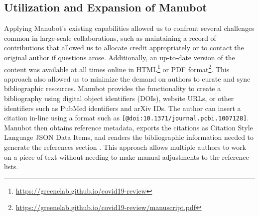 \documentclass[twocolumn]{ceurart}
\begin{document}
\hypertarget{utilization-and-expansion-of-manubot}{%
\subsection{Utilization and Expansion of Manubot}\label{utilization-and-expansion-of-manubot}}

Applying Manubot's existing capabilities allowed us to confront several challenges common in large-scale collaborations, such as maintaining a record of contributions that allowed us to allocate credit appropriately or to contact the original author if questions arose.
Additionally, an up-to-date version of the content was available at all times online in HTML\footnote{\url{https://greenelab.github.io/covid19-review}} or PDF format\footnote{\url{https://greenelab.github.io/covid19-review/manuscript.pdf}}.
This approach also allowed us to minimize the demand on authors to curate and sync bibliographic resources.
Manubot provides the functionality to create a bibliography using digital object identifiers (DOIs), website URLs, or other identifiers such as PubMed identifiers and arXiv IDs.
The author can insert a citation in-line using a format such as \texttt{{[}@doi:10.1371/journal.pcbi.1007128{]}}.
Manubot then obtains reference metadata, exports the citations as Citation Style Language JSON Data Items, and renders the bibliographic information needed to generate the references section \citep{YuJbg3zO}.
This approach allows multiple authors to work on a piece of text without needing to make manual adjustments to the reference lists.
\end{document}
